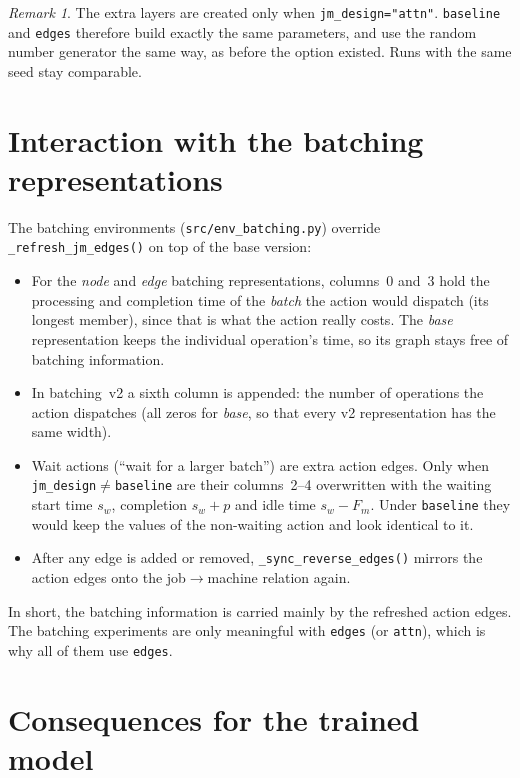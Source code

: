 \documentclass[11pt,a4paper]{article}
\newcommand{\code}[1]{\texttt{#1}}
\theoremstyle{remark}
\newtheorem*{remark}{Remark}
\begin{document}
\begin{remark}
The extra layers are created only when \code{jm\_design="attn"}. \code{baseline} and
\code{edges} therefore build exactly the same parameters, and use the random number
generator the same way, as before the option existed. Runs with the same seed
stay comparable.
\end{remark}

\section{Interaction with the batching representations}
\label{sec:batching}

The batching environments (\code{src/env\_batching.py}) override
\code{\_refresh\_jm\_edges()} on top of the base version:
\begin{itemize}
  \item For the \emph{node} and \emph{edge} batching representations, columns~0 and~3 hold
        the processing and completion time of the \emph{batch} the action would dispatch
        (its longest member), since that is what the action really costs. The
        \emph{base} representation keeps the individual operation's time, so its graph
        stays free of batching information.
  \item In batching~v2 a sixth column is appended: the number of operations the action
        dispatches (all zeros for \emph{base}, so that every v2 representation has the
        same width).
  \item Wait actions (``wait for a larger batch'') are extra action edges. Only when
        \code{jm\_design}$\neq$\code{baseline} are their columns~2--4 overwritten with
        the waiting start time $s_w$, completion $s_w+p$ and idle time $s_w-F_m$. Under
        \code{baseline} they would keep the values of the non-waiting action and look
        identical to it.
  \item After any edge is added or removed, \code{\_sync\_reverse\_edges()} mirrors the
        action edges onto the job$\to$machine relation again.
\end{itemize}
In short, the batching information is carried mainly by the refreshed action edges. The
batching experiments are only meaningful with \code{edges} (or \code{attn}), which is
why all of them use \code{edges}.

\section{Consequences for the trained model}
\label{sec:consequences}
\end{document}

